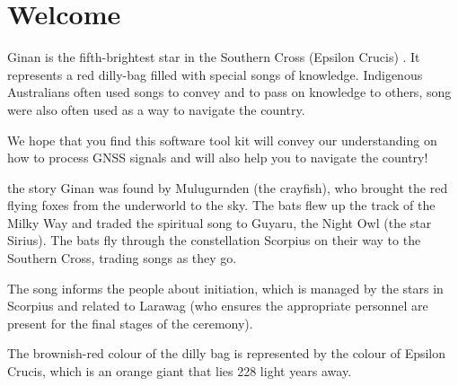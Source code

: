 \chapter{Welcome}
\label{ch:Ginan}

Ginan is the fifth-brightest star in the Southern Cross (Epsilon Crucis) . It represents a red dilly-bag filled with special songs of knowledge.
Indigenous Australians often used songs to convey and to pass on knowledge to others, song were also often used as a way to navigate the country.

We hope that you find this software tool kit will convey our understanding on how to process GNSS signals and will also help you to navigate the country!

the story Ginan was found by Mulugurnden (the crayfish), who brought the red flying foxes from the underworld to the sky. The bats flew up the track of the Milky Way and traded the spiritual song to Guyaru, the Night Owl (the star Sirius). The bats fly through the constellation Scorpius on their way to the Southern Cross, trading songs as they go.

The song informs the people about initiation, which is managed by the stars in Scorpius and related to Larawag (who ensures the appropriate personnel are present for the final stages of the ceremony).

The brownish-red colour of the dilly bag is represented by the colour of Epsilon Crucis, which is an orange giant that lies 228 light years away.

